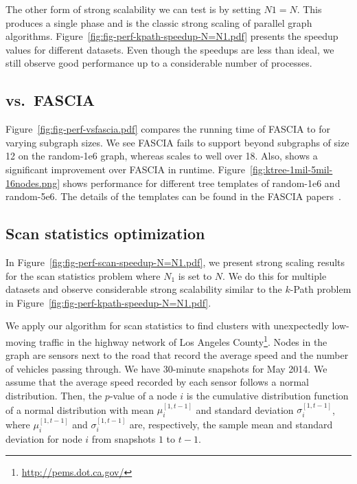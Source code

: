 The other form of strong scalability we can test is by setting $N1=N$. This produces a single phase and is the classic strong scaling of parallel graph algorithms. Figure~\ref{fig:fig-perf-kpath-speedup-N=N1.pdf} presents the speedup values for different datasets. Even though the speedups are less than ideal, we still observe good performance up to a considerable number of processes.

\subsection{\ouralgo{} vs.\ FASCIA}
\label{sec:perf-vsfasci}
Figure~\ref{fig:fig-perf-vsfascia.pdf} compares the running time of FASCIA to \ouralgo{} for varying subgraph sizes. We see FASCIA fails to support beyond subgraphs of size 12 on the random-1e6 graph, whereas \ouralgo{} scales to well over 18. Also, \ouralgo{} shows a significant improvement over FASCIA in runtime. Figure~\ref{fig:ktree-1mil-5mil-16nodes.png} shows \ouralgo{} performance for different tree templates of random-1e6 and random-5e6. The details of the templates can be found in the FASCIA papers~\cite{slota:icpp13, slota:ipdps14}.

\subsection{Scan statistics optimization}
\label{sec:perf-scan-stat}
In Figure~\ref{fig:fig-perf-scan-speedup-N=N1.pdf}, we present strong scaling results for the scan statistics problem where $N_1$ is set to $N$. We do this for multiple datasets and observe considerable strong scalability similar to the $k$-Path problem in Figure~\ref{fig:fig-perf-kpath-speedup-N=N1.pdf}.

We apply our algorithm for scan statistics to find clusters with unexpectedly low-moving traffic in the highway network of Los Angeles County\footnote{\url{http://pems.dot.ca.gov/}}. Nodes in the graph are sensors next to the road that record the average speed and the number of vehicles passing through. We have 30-minute snapshots for May 2014. We assume that the average speed recorded by each sensor follows a normal distribution. Then, the $p$-value of a node $i$ is the cumulative distribution function of a normal distribution with mean  $\mu_i^{[1,t-1]}$ and standard deviation $\sigma_i^{[1,t-1]}$, where $\mu_i^{[1,t-1]}$ and $\sigma_i^{[1,t-1]}$ are, respectively, the sample mean and standard deviation for node $i$ from snapshots $1$ to $t-1$.

